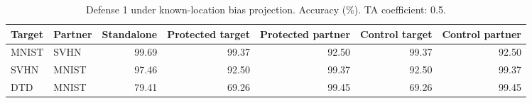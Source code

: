 \begin{table}[t]
\centering\small
\caption{Defense 1 under known-location bias projection. Accuracy (\%). TA coefficient: 0.5.}
\begin{tabular}{llrrrrr}
\toprule
Target & Partner & Standalone & Protected target & Protected partner & Control target & Control partner \\
\midrule
MNIST & SVHN & 99.69 & 99.37 & 92.50 & 99.37 & 92.50 \\
SVHN & MNIST & 97.46 & 92.50 & 99.37 & 92.50 & 99.37 \\
DTD & MNIST & 79.41 & 69.26 & 99.45 & 69.26 & 99.45 \\
\bottomrule
\end{tabular}
\end{table}
